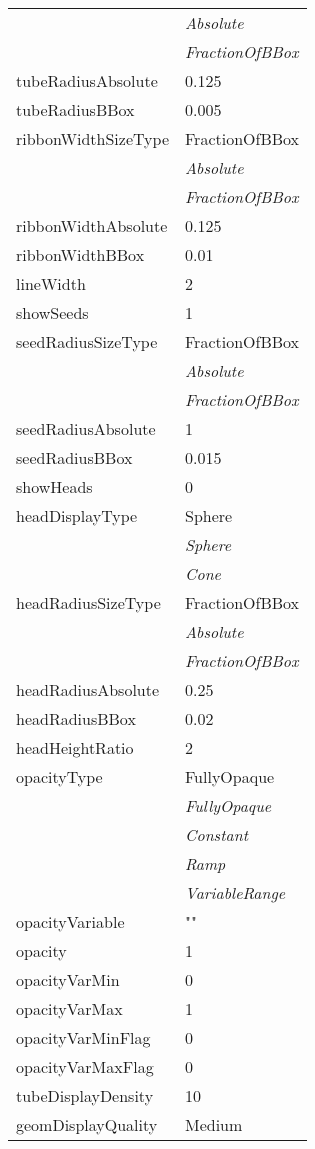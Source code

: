 \documentclass[10pt,a4paper]{report}
\begin{document}
\begin{longtable}{ll}
 & {\it  Absolute} \\
 & {\it  FractionOfBBox} \\
tubeRadiusAbsolute  &  0.125 \\
tubeRadiusBBox  &  0.005 \\
ribbonWidthSizeType  &  FractionOfBBox   \\
 & {\it  Absolute} \\
 & {\it  FractionOfBBox} \\
ribbonWidthAbsolute  &  0.125 \\
ribbonWidthBBox  &  0.01 \\
lineWidth  &  2 \\
showSeeds  &  1 \\
seedRadiusSizeType  &  FractionOfBBox   \\
 & {\it  Absolute} \\
 & {\it  FractionOfBBox} \\
seedRadiusAbsolute  &  1 \\
seedRadiusBBox  &  0.015 \\
showHeads  &  0 \\
headDisplayType  &  Sphere   \\
 & {\it  Sphere} \\
 & {\it  Cone} \\
headRadiusSizeType  &  FractionOfBBox   \\
 & {\it  Absolute} \\
 & {\it  FractionOfBBox} \\
headRadiusAbsolute  &  0.25 \\
headRadiusBBox  &  0.02 \\
headHeightRatio  &  2 \\
opacityType  &  FullyOpaque   \\
 & {\it  FullyOpaque} \\
 & {\it  Constant} \\
 & {\it  Ramp} \\
 & {\it  VariableRange} \\
opacityVariable  &  "" \\
opacity  &  1 \\
opacityVarMin  &  0 \\
opacityVarMax  &  1 \\
opacityVarMinFlag  &  0 \\
opacityVarMaxFlag  &  0 \\
tubeDisplayDensity  &  10 \\
geomDisplayQuality  &  Medium   \\

\end{longtable}
\end{document}
